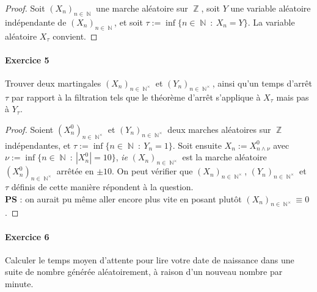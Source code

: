 \documentclass{article}
\theoremstyle{definition}
\numberwithin{equation}{section}
\DeclareMathOperator{\Z}{\mathbb{Z}}
\DeclareMathOperator{\N}{\mathbb{N}}
\begin{document}
\begin{proof}
Soit $(X_n)_{n\in \N}$ une marche aléatoire sur $\Z$, soit $Y$ une variable aléatoire indépendante de $(X_n)_{n\in \N}$, et soit $\tau:=\inf\{n\in\N~:~X_n = Y\}$. La variable aléatoire $X_\tau$ convient. %
\end{proof}


\paragraph{Exercice 5}
Trouver deux martingales $(X_n)_{n\in\N^\times}$ et $(Y_n)_{n\in\N^\times}$, ainsi qu'un temps d'arrêt $\tau$ par rapport à la filtration tels que le théorème d'arrêt s'applique à $X_\tau$ mais pas à $Y_\tau$.

\begin{proof}
Soient $(X^0_n)_{n\in\N^\times}$ et $(Y_n)_{n\in\N^\times}$ deux marches aléatoires sur $\Z$ indépendantes, et $\tau:=\inf\{n\in\N~:~Y_n = 1\}$. Soit ensuite $X_n:=X^0_{n\wedge \nu}$ avec $\nu:=\inf\{n\in\N~:~|X^0_n|=10\}$, \textit{ie} $(X_n)_{n\in\N^\times}$ est la marche aléatoire $(X^0_n)_{n\in\N^\times}$ arrêtée en $\pm 10$. On peut vérifier que $(X_n)_{n\in\N^\times}$, $(Y_n)_{n\in\N^\times}$ et $\tau$ définis de cette manière répondent à la question.\\
\textbf{PS} : on aurait pu même aller encore plus vite en posant plutôt $(X_n)_{n\in\N^\times}\equiv 0$.
\end{proof}


\paragraph{Exercice 6}
Calculer le temps moyen d'attente pour lire votre date de naissance dans une suite de nombre générée aléatoirement, à raison d'un nouveau nombre par minute.
\end{document}

